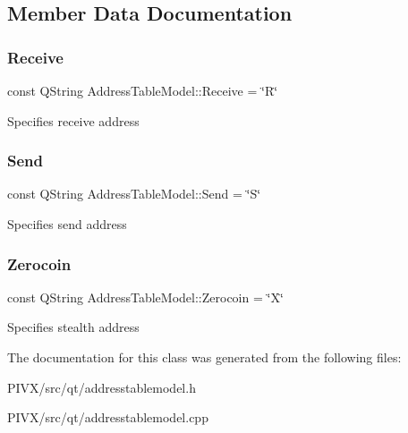 \subsection{Member Data Documentation}
\mbox{\label{class_address_table_model_acaed83193545456eab47dd7be1d2ceba}} 
\subsubsection{\texorpdfstring{Receive}{Receive}}
{\footnotesize\ttfamily const Q\+String Address\+Table\+Model\+::\+Receive = \char`\"{}R\char`\"{}\hspace{0.3cm}{\ttfamily [static]}}

Specifies receive address \mbox{\label{class_address_table_model_a7c74e158d014a757c2edcc5bcb1e9a62}} 
\subsubsection{\texorpdfstring{Send}{Send}}
{\footnotesize\ttfamily const Q\+String Address\+Table\+Model\+::\+Send = \char`\"{}S\char`\"{}\hspace{0.3cm}{\ttfamily [static]}}

Specifies send address \mbox{\label{class_address_table_model_a8792d7ee2440aa349488ed6a369e50b6}} 
\subsubsection{\texorpdfstring{Zerocoin}{Zerocoin}}
{\footnotesize\ttfamily const Q\+String Address\+Table\+Model\+::\+Zerocoin = \char`\"{}X\char`\"{}\hspace{0.3cm}{\ttfamily [static]}}

Specifies stealth address 

The documentation for this class was generated from the following files\+:\begin{DoxyCompactItemize}
\item 
P\+I\+V\+X/src/qt/addresstablemodel.\+h\item 
P\+I\+V\+X/src/qt/addresstablemodel.\+cpp\end{DoxyCompactItemize}
